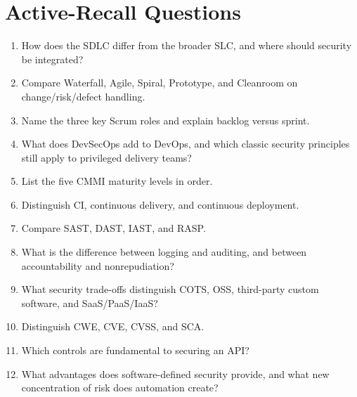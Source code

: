 \documentclass[10pt,letterpaper]{article}
\begin{document}
\section{Active-Recall Questions}
\begin{enumerate}
\item How does the SDLC differ from the broader SLC, and where should security be integrated?
\item Compare Waterfall, Agile, Spiral, Prototype, and Cleanroom on change/risk/defect handling.
\item Name the three key Scrum roles and explain backlog versus sprint.
\item What does DevSecOps add to DevOps, and which classic security principles still apply to privileged delivery teams?
\item List the five CMMI maturity levels in order.
\item Distinguish CI, continuous delivery, and continuous deployment.
\item Compare SAST, DAST, IAST, and RASP.
\item What is the difference between logging and auditing, and between accountability and nonrepudiation?
\item What security trade-offs distinguish COTS, OSS, third-party custom software, and SaaS/PaaS/IaaS?
\item Distinguish CWE, CVE, CVSS, and SCA.
\item Which controls are fundamental to securing an API?
\item What advantages does software-defined security provide, and what new concentration of risk does automation create?
\end{enumerate}
\end{document}
